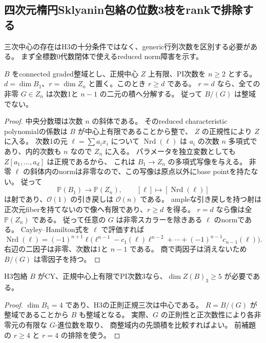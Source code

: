 \subsection{四次元楕円Sklyanin包絡の位数3枝をrankで排除する}
\label{subsec:sklyanin-rank-obstruction}
三次中心の存在はH3の十分条件ではなく、generic行列次数を区別する必要がある。
まず全標数0代数閉体で使えるreduced norm障害を示す。

\begin{lemma}[最小中心次元での全norm切断の排除]
\label{lem:central-norm-rank}
$B$ をconnected graded整域とし、正規中心 $Z$ 上有限、PI次数を $n\ge2$ とする。
$d=\dim B_1$、$r=\dim Z_n$ と置く。このとき $r\ge d$ である。
$r=d$ なら、全ての非零 $G\in Z_n$ は次数1と $n-1$ の二元の積へ分解する。
従って $B/(G)$ は整域でない。
\end{lemma}
\begin{proof}
中央分数環は次数 $n$ の斜体である。
そのreduced characteristic polynomialの係数は $B$ が中心上有限であることから整で、
$Z$ の正規性により $Z$ に入る。
次数1の元 $\ell=\sum a_ix_i$ について $\operatorname{Nrd}(\ell)$ は
$a_i$ の次数 $n$ 多項式であり、内的次数も $n$ なので $Z_n$ に入る。
パラメータを独立変数としても $Z[a_1,\ldots,a_d]$ は正規であるから、
これは $B_1\to Z_n$ の多項式写像を与える。
非零 $\ell$ の斜体内のnormは非零なので、この写像は原点以外にbase pointを持たない。
従って
\[
 \mathbb P(B_1)\longrightarrow\mathbb P(Z_n),\qquad
 [\ell]\longmapsto[\operatorname{Nrd}(\ell)]
\]
は射であり、$\mathcal O(1)$ の引き戻しは $\mathcal O(n)$ である。
ampleな引き戻しを持つ射は正次元fiberを持てないので像へ有限であり、$r\ge d$ を得る。
$r=d$ なら像は全 $\mathbb P(Z_n)$ である。
従って任意の $G$ は非零スカラーを除きある $\ell$ のnormである。
Cayley--Hamilton式を $\ell$ で評価すれば
\[
 \operatorname{Nrd}(\ell)=(-1)^{n+1}\ell
 \bigl(\ell^{n-1}-c_1(\ell)\ell^{n-2}+\cdots+(-1)^{n-1}c_{n-1}(\ell)\bigr).
\]
右辺の二因子は非零、次数は1と $n-1$ である。
商で両因子は消えないため $B/(G)$ は零因子を持つ。
\end{proof}

\begin{corollary}[CY PI3包絡の中心三次の必要下界]
\label{cor:PI3-central-dimension}
H3包絡 $B$ がCY、正規中心上有限でPI次数3なら、$\dim Z(B)_3\ge5$ が必要である。
\end{corollary}
\begin{proof}
$\dim B_1=4$ であり、H3の正則正規三次は中心である。
$R=B/(G)$ が整域であることから $B$ も整域となる。
実際、$G$ の正則性と正次数性により各非零元の有限な $G$-進位数を取り、
商整域内の先頭積を比較すればよい。
前補題の $r\ge4$ と $r=4$ の排除を使う。
\end{proof}

